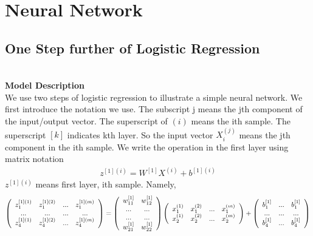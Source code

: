 \documentclass[a4paper]{article}
\begin{document}
\section{Neural Network}
\subsection{One Step further of Logistic Regression}\\
{\bf Model Description}\\
We use two steps of logistic regression to illustrate a simple neural network. We first introduce the notation we use. The subscript j means the jth component of the input/output vector. The superscript of $(i)$ means the ith sample. The superscript $[k]$ indicates kth layer. So the input vector $X_i^{(j)}$ means the jth component in the ith sample. We write the operation in the first layer using matrix notation
\begin{align*}
	z^{[1](i)} = W^{[1]} X^{(i)} + b^{[1](i)}
\end{align*}
 $z^{[1](i)}$ means first layer, ith sample.
 Namely,
\begin{align*}
\left( \begin{array} {c c c c}
z_1^{[1](1)} & z_1^{[1](2)} & ... & z_1^{[1](m)} \\
... & ... & ... & ... \\
z_4^{[1](1)} & z_4^{[1](2)} & ... & z_4^{[1](m)} \\
\end{array} \right)
=\left( \begin{array} {c c}
w_{11}^{[1]} & w_{12}^{[1]}   \\
... & ... \\
... & ... \\
w_{21}^{[1]} & w_{22}^{[1]}   \\
\end{array} \right)
\left( \begin{array} {c c c c}
x_1^{(1)} & x_1^{(2)} & ... & x_1^{(m)} \\
x_2^{(1)} & x_2^{(2)} & ... & x_2^{(m)} \\
\end{array} \right)
+
\left( \begin{array} {c c c }
b_1^{[1]} & ... &  b_1^{[1]} \\
... & ... & ... \\
b_4^{[1]} & ... &  b_4^{[1]} \\
\end{array} \right)
\end{align*}
\end{document}
